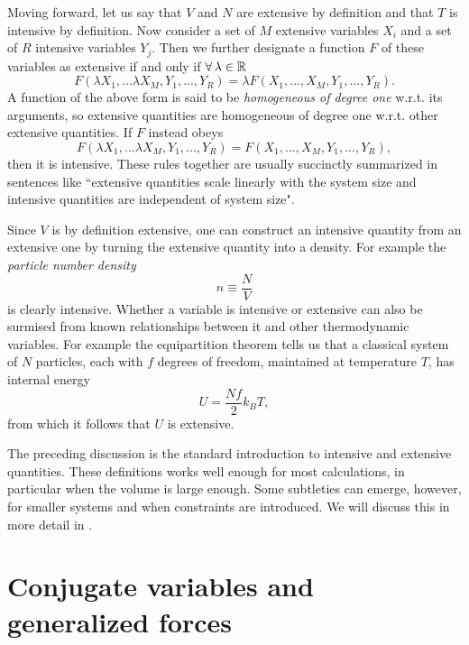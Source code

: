 Moving forward, let us say that $V$ and $N$ are extensive by definition and that
$T$ is intensive by definition. Now consider a set of $M$ extensive variables 
${X_i}$ and a set of $R$ intensive variables ${Y_j}$. Then we further designate 
a function $F$ of these variables as extensive if and only if $\operatorname{\forall}\lambda\in\mathbb{R}$
\begin{equation}\label{eq:extensive}
F(\lambda X_1, ... \lambda X_M,Y_1,...,Y_R)=\lambda F(X_1,...,X_M,Y_1,...,Y_R).
\end{equation}
A function of the above form is said to be {\it homogeneous of degree
one} w.r.t. its arguments, so extensive quantities are
homogeneous of degree one w.r.t. other extensive quantities. If $F$ instead obeys
\begin{equation}\label{eq:intensive}
F(\lambda X_1, ... \lambda X_M,Y_1,...,Y_R)= F(X_1,...,X_M,Y_1,...,Y_R),
\end{equation}
then it is intensive. These rules together are usually succinctly summarized in
sentences like ``extensive quantities scale linearly with the system size and
intensive quantities are independent of system size".

Since $V$ is by definition extensive, one can construct an intensive quantity
from an extensive one by turning the extensive quantity into a density. For
example the {\it particle number density}
\begin{equation}
n\equiv \frac{N}{V}
\end{equation}
is clearly intensive. Whether a variable is intensive or extensive can also be
surmised from known relationships between it and other thermodynamic variables.
For example the equipartition theorem tells us that a classical system of $N$
particles, each with $f$ degrees of freedom, maintained at temperature $T$, has
internal energy
\begin{equation}
U=\frac{Nf}{2}k_B T,
\end{equation}  
from which it follows that $U$ is extensive.

The preceding discussion is the standard introduction to intensive and extensive
quantities. These definitions works well enough for most calculations, in
particular when the volume is large enough. Some subtleties can emerge, however,
for smaller systems and when constraints are introduced. We will discuss this in
more detail in .

\section{Conjugate variables and generalized forces}

